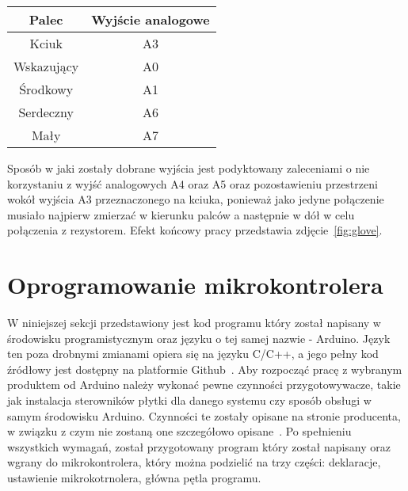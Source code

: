 \begin{center}
\begin{tabular}{|c|c|}
\hline
Palec & Wyjście analogowe \\ \hline
Kciuk & A3 \\ \hline
Wskazujący & A0 \\ \hline
Środkowy & A1 \\ \hline
Serdeczny & A6 \\ \hline
Mały & A7 \\ \hline
\hline
\end{tabular}
\end{center}

Sposób w jaki zostały dobrane wyjścia jest podyktowany zaleceniami o nie korzystaniu z wyjść analogowych A4 oraz A5 oraz pozostawieniu przestrzeni wokół wyjścia A3 przeznaczonego na kciuka, ponieważ jako jedyne połączenie musiało najpierw zmierzać w kierunku palców a następnie w dół w celu połączenia z rezystorem. Efekt końcowy pracy przedstawia zdjęcie~\ref{fig:glove}.

\section{Oprogramowanie mikrokontrolera}
\label{sec:oprogramowanie}

W niniejszej sekcji przedstawiony jest kod programu który został napisany w środowisku programistycznym oraz języku o tej samej nazwie - Arduino. Język ten poza drobnymi zmianami opiera się na języku C/C++, a jego pełny kod źródłowy jest dostępny na platformie Github~\cite{jArduino}. Aby rozpocząć pracę z wybranym produktem od Arduino należy wykonać pewne czynności przygotowywacze, takie jak instalacja sterowników płytki dla danego systemu czy sposób obsługi w samym środowisku Arduino. Czynności te zostały opisane na stronie producenta, w związku z czym nie zostaną one szczegółowo opisane~\cite{guideArduino}. Po spełnieniu wszystkich wymagań, został przygotowany program który został napisany oraz wgrany do mikrokontrolera, który można podzielić na trzy części: deklaracje, ustawienie mikrokotrnolera, główna pętla programu.

